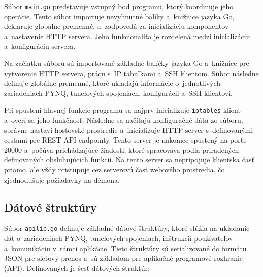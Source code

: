 Súbor \verb|main.go| predstavuje vstupný bod programu, ktorý koordinuje jeho operácie. Tento súbor importuje nevyhnutné balíky a~knižnice jazyka Go, deklaruje globálne premenné, a~zodpovedá za inicializáciu komponentov a~nastavenie HTTP servera. Jeho funkcionalita je rozdelená medzi inicializáciu a~konfiguráciu servera.

Na začiatku súboru sú importované základné balíčky jazyka Go a~knižnice pre vytvorenie HTTP servera, prácu s~IP tabuľkami a~SSH klientom. Súbor následne definuje globálne premenné, ktoré ukladajú informácie o~jednotlivých zariadeniach PYNQ, tunelových spojeniach, konfigurácii a~SSH klientovi.

Pri spustení hlavnej funkcie programu sa najprv inicializuje \verb|iptables| klient a~overí sa jeho funkčnosť. Následne sa načítajú konfiguračné dáta zo súboru, správne nastaví hosťovské prostredie a~inicializuje HTTP server s~definovanými cestami pre REST API endpointy. Tento server je nakoniec spustený na porte 20000 a~počúva prichádzajúce žiadosti, ktoré spracováva podľa priradených definovaných obsluhujúcich funkcií. Na tento server sa nepripojuje klientska časť priamo, ale vždy pristupuje cez serverovú časť webového prostredia, čo zjednodušuje požiadavky na démona.

\subsection{Dátové štruktúry}

Súbor \verb|apilib.go| definuje základné dátové štruktúry, ktoré slúžia na ukladanie dát o~zariadeniach PYNQ, tunelových spojeniach, inštrukcií používateľov a~komunikáciu v~rámci aplikácie. Tieto štruktúry sú serializované do formátu JSON pre sieťový prenos a~sú základom pre aplikačné programové rozhranie (API). Definovaných je šesť dátových štruktúr:

